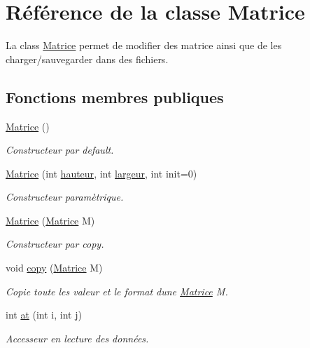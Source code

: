 \hypertarget{class_matrice}{}\section{Référence de la classe Matrice}
\label{class_matrice}


La class \hyperlink{class_matrice}{Matrice} permet de modifier des matrice ainsi que de les charger/sauvegarder dans des fichiers.  


\subsection*{Fonctions membres publiques}
\begin{DoxyCompactItemize}
\item 
\hyperlink{class_matrice_a7281d022328e8f455eff2dc73a78593a}{Matrice} ()
\begin{DoxyCompactList}\small\item\em Constructeur par default. \end{DoxyCompactList}\item 
\hyperlink{class_matrice_af00cc9de4742a97a34d6dd3a4e5bca93}{Matrice} (int \hyperlink{class_matrice_a40c26a2a701faf2b1680886a8aeeadaf}{hauteur}, int \hyperlink{class_matrice_a01649b7f1fb32a6a8561c308a22bd22f}{largeur}, int init=0)
\begin{DoxyCompactList}\small\item\em Constructeur paramètrique. \end{DoxyCompactList}\item 
\hyperlink{class_matrice_a5a09b487960e0274a8caba85cf34397d}{Matrice} (\hyperlink{class_matrice}{Matrice} M)
\begin{DoxyCompactList}\small\item\em Constructeur par copy. \end{DoxyCompactList}\item 
void \hyperlink{class_matrice_a61f65eda2c1f1853e8f72cd25de54776}{copy} (\hyperlink{class_matrice}{Matrice} M)
\begin{DoxyCompactList}\small\item\em Copie toute les valeur et le format d\textquotesingle{}une \hyperlink{class_matrice}{Matrice} M. \end{DoxyCompactList}\item 
int \hyperlink{class_matrice_ad735382f0606ee683c761402af6f5a78}{at} (int i, int j)
\begin{DoxyCompactList}\small\item\em Accesseur en lecture des données. \end{DoxyCompactList}\item 

\end{DoxyCompactItemize}
